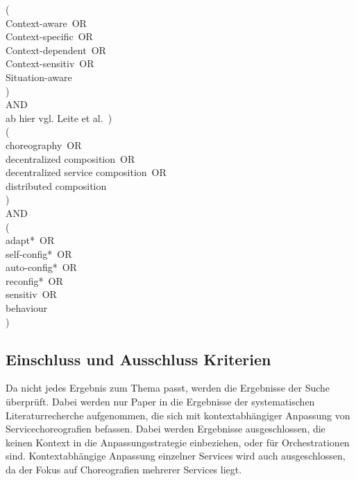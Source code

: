 \documentclass[conference,compsoc]{IEEEtran}
\begin{document}
(\\
	\glqq Context-aware\grqq~OR\\
	\glqq Context-specific\grqq~OR\\
	\glqq Context-dependent\grqq~OR\\
	\glqq Context-sensitiv\grqq~OR\\
	\glqq Situation-aware\grqq \\
)\\
AND\\
ab hier vgl. Leite et al.~\cite{leite2013systematic}) \\
 (\\
\glqq choreography\grqq~OR\\
\glqq decentralized composition\grqq~OR\\
\glqq decentralized service composition\grqq~OR\\
\glqq distributed composition\grqq\\
) \\
AND\\
(\\
\glqq adapt*\grqq~OR\\
\glqq self-config*\grqq~OR\\
\glqq auto-config*\grqq~OR\\
\glqq reconfig*\grqq~OR\\
\glqq sensitiv\grqq~OR\\
\glqq behaviour\grqq\\
)\\

\subsection{Einschluss und Ausschluss Kriterien}
Da nicht jedes Ergebnis zum Thema passt, werden die Ergebnisse der Suche überprüft. Dabei werden nur Paper in die Ergebnisse der systematischen Literaturrecherche aufgenommen, die sich mit kontextabhängiger Anpassung von Servicechoreografien befassen. Dabei werden Ergebnisse ausgeschlossen, die keinen Kontext in die Anpassungsstrategie einbeziehen, oder für Orchestrationen sind. Kontextabhängige Anpassung einzelner Services wird auch ausgeschlossen, da der Fokus auf Choreografien mehrerer Services liegt.
\end{document}
